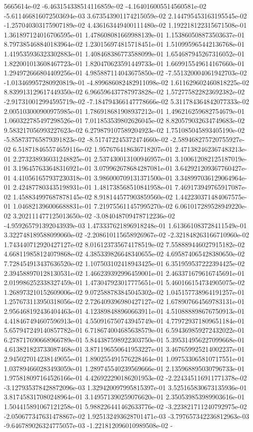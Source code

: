 5665614e-02	-6.463154338514116859e-02	-4.164016005514560581e-02	-5.611466816072503694e-03	3.673543901174215059e-02	2.144795453163195545e-02	-1.257040303175907189e-02	4.436163449400111480e-02	1.192218122315671508e-01	1.361897124016706595e-01	1.478608081669988139e-01	1.153860508873503637e-01	8.797385468840183964e-02	1.230156974815718451e-01	1.510995965442136768e-01	1.419535936323302883e-01	1.408468386773588099e-01	1.654687945267316052e-01	1.822001013608467723e-01	1.820470623591449733e-01	1.669915549614167660e-01	1.294972666804409256e-01	4.985887114043675850e-02	-7.551320004061942703e-02	-1.013469957280920819e-01	-4.899686082482911098e-02	1.611629602460818225e-02	8.839913129617449350e-02	6.966596437787973828e-02	1.572775822823692382e-02	-2.917310012994595719e-02	-7.184794366147778666e-02	5.311784364842077333e-02	2.005103000900975985e-01	1.786918681908937212e-01	1.496216259682754679e-01	1.060322785497298526e-01	7.011853539802626045e-02	8.820579032634749683e-02	9.583217056993227623e-02	6.279879107589204923e-02	1.751085045893405190e-02	-5.858737765879391823e-02	-8.517472245372474660e-02	-2.589468275720755927e-02	6.518718465574659116e-02	1.957676418636718207e-01	2.471382462367483213e-01	2.273238936031248825e-01	2.537430013100946957e-01	3.100612082125187019e-01	3.196457633648316921e-01	3.079962678684287081e-01	3.642921209367760427e-01	4.410561657937230318e-01	3.986000709131371500e-01	3.348997036129064964e-01	2.424877803435198931e-01	1.481738568510841958e-01	7.469173949765917087e-02	1.458834997687878145e-02	8.918144577903859560e-02	1.442230371484067575e-01	1.046821396006688831e-01	7.219755611457995270e-02	6.061017289528949220e-02	3.202111477125013650e-02	-3.084048709478712236e-02	-4.959265791392043939e-03	1.473337621896918248e-01	1.613661083728411549e-01	3.322748189588099060e-02	-2.208610115658926967e-02	-2.321848263166710960e-02	1.743440712920427127e-02	8.016123735674178519e-02	7.558889446027915182e-02	4.668119858124079868e-02	4.385339826648340655e-02	4.695874065428380650e-02	7.728454913437636520e-02	1.107503102418943425e-01	6.351959537222394425e-02	2.394588970128130531e-02	1.466239392996459001e-01	2.463371679616745691e-01	2.019986252338327459e-01	1.473047923017775651e-01	5.460166154734905075e-02	1.268973210152609006e-02	9.072588783845045302e-02	1.045157738964191257e-01	1.257673113950318056e-02	2.726409396980427127e-02	1.678907664569783131e-01	2.956468192436404463e-01	4.123898488960663911e-01	4.510888898676750913e-01	4.418467494607596913e-01	4.550916750743945749e-01	4.779729371809651184e-01	5.657947249140857782e-01	6.718674004685638579e-01	6.594369859272432022e-01	6.278717690668966789e-01	5.844387598922303750e-01	5.395314956227099668e-01	4.613821823733087468e-01	3.871196550641953227e-01	3.467659925214002237e-01	2.945027014238149055e-01	1.890255491576228464e-01	1.097533065810717551e-01	1.037894660283493059e-01	1.289745540239569666e-01	2.135968895030796733e-01	1.975818097164526166e-01	4.426922290186201953e-02	-2.224345116911771378e-02	-3.127935378428872096e-03	1.329420097995815397e-01	3.525165830673135936e-01	3.817458317080248964e-01	3.149571390259076620e-01	2.350539853989903616e-01	1.504415891067121258e-01	5.988226441462633776e-02	-3.223821711240792975e-02	-2.050677347631478867e-02	1.925132493628701471e-03	-3.797657342236812963e-03	-9.646789026324775057e-03	-1.221812096010989508e-02	-
